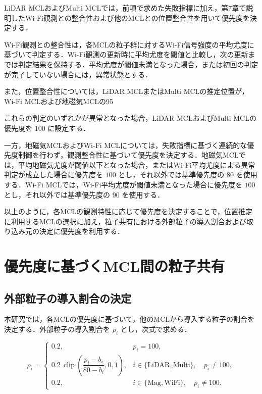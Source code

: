 LiDAR MCLおよびMulti MCLでは，前項で求めた失敗指標に加え，第7章で説明したWi-Fi観測との整合性および他のMCLとの位置整合性を用いて優先度を決定する．

Wi-Fi観測との整合性は，各MCLの粒子群に対するWi-Fi信号強度の平均尤度に基づいて判定する．Wi-Fi観測の更新時に平均尤度を閾値と比較し，次の更新までは判定結果を保持する．平均尤度が閾値未満となった場合，または初回の判定が完了していない場合には，異常状態とする．

また，位置整合性については，LiDAR MCLまたはMulti MCLの推定位置が，Wi-Fi MCLおよび地磁気MCLの95%

これらの判定のいずれかが異常となった場合，LiDAR MCLおよびMulti MCLの優先度を $100$ に設定する．

一方，地磁気MCLおよびWi-Fi MCLについては，失敗指標に基づく連続的な優先度制御を行わず，観測整合性に基づいて優先度を決定する．地磁気MCLでは，平均地磁気尤度が閾値以下となった場合，またはWi-Fi平均尤度による異常判定が成立した場合に優先度を $100$ とし，それ以外では基準優先度の $80$ を使用する．Wi-Fi MCLでは，Wi-Fi平均尤度が閾値未満となった場合に優先度を $100$ とし，それ以外では基準優先度の $90$ を使用する．

以上のように，各MCLの観測特性に応じて優先度を決定することで，位置推定に利用するMCLの選択に加え，粒子共有における外部粒子の導入割合および取り込み元の決定に優先度を利用する．

\section{優先度に基づくMCL間の粒子共有}

\subsection{外部粒子の導入割合の決定}

本研究では，各MCLの優先度に基づいて，他のMCLから導入する粒子の割合を決定する．外部粒子の導入割合を $\rho_i$ とし，次式で求める．

\[
\rho_i=
\begin{cases}
0.2,
& p_i=100,\\[3pt]
0.2\,
\operatorname{clip}
\left(
\dfrac{p_i-b_i}{80-b_i},0,1
\right),
& i\in\{\mathrm{LiDAR},\mathrm{Multi}\},
\quad p_i\ne100,\\[8pt]
0.2,
& i\in\{\mathrm{Mag},\mathrm{WiFi}\},
\quad p_i\ne100.
\end{cases}
\]

